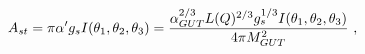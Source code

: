 \begin{equation}\label{stringamp}
A_{st}=\pi\alpha'g_s I(\theta_1,\theta_2,\theta_3) = {
\alpha_{GUT}^{2/3} L(Q)^{2/3} g_{s}^{1/3}
I(\theta_1,\theta_2,\theta_3) \over 4\pi M_{GUT}^2 } \
,\end{equation} 
